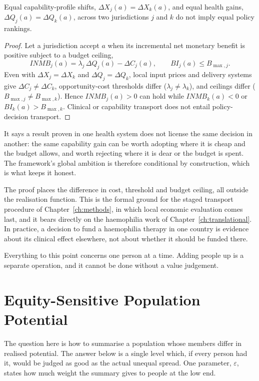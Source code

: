 \begin{theorem}
\label{thm:nontransport}
Equal capability-profile shifts, $\Delta X_j(a)=\Delta X_k(a)$, and equal health
gains, $\Delta Q_j(a)=\Delta Q_k(a)$, across two jurisdictions $j$ and $k$ do not
imply equal policy rankings.
\end{theorem}
\begin{proof}
Let a jurisdiction accept $a$ when its incremental net monetary benefit is positive
subject to a budget ceiling, \citep{stinnett_mullahy_1998}
\begin{equation}
INMB_j(a)=\lambda_j\,\Delta Q_j(a)-\Delta C_j(a),\qquad BI_j(a)\le B_{\max,j}.
\end{equation}
Even with $\Delta X_j=\Delta X_k$ and $\Delta Q_j=\Delta Q_k$, local input prices and
delivery systems give $\Delta C_j\ne\Delta C_k$, opportunity-cost thresholds differ
($\lambda_j\ne\lambda_k$), and ceilings differ ($B_{\max,j}\ne B_{\max,k}$). Hence
$INMB_j(a)>0$ can hold while $INMB_k(a)<0$ or $BI_k(a)>B_{\max,k}$. Clinical or
capability transport does not entail policy-decision transport.
\end{proof}
\begin{reading}
It says a result proven in one health system does not license the same decision in
another: the same capability gain can be worth adopting where it is cheap and the
budget allows, and worth rejecting where it is dear or the budget is spent. The
framework's global ambition is therefore conditional by construction, which is what
keeps it honest.
\end{reading}

The proof places the difference in cost, threshold and budget ceiling, all
outside the realisation function. This is the formal ground for the staged
transport procedure of Chapter~\ref{ch:methods}, in which local economic
evaluation comes last, and it bears directly on the haemophilia work of
Chapter~\ref{ch:translational}. In practice, a decision to fund a haemophilia
therapy in one country is evidence about its clinical effect elsewhere, not
about whether it should be funded there.

Everything to this point concerns one person at a time. Adding people up is a
separate operation, and it cannot be done without a value judgement.

\section{Equity-Sensitive Population Potential}
\label{sec:E-equity}
The question here is how to summarise a population whose members differ in
realised potential. The answer below is a single level which, if every person
had it, would be judged as good as the actual unequal spread. One parameter,
$\varepsilon$, states how much weight the summary gives to people at the low end.

